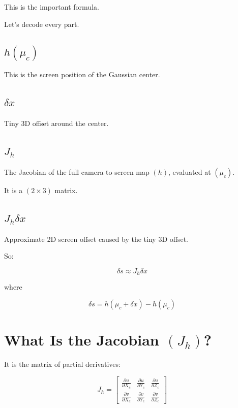 \documentclass[11pt,letterpaper]{article}
\begin{document}
This is the important formula.

Let's decode every part.

\subsection{\texorpdfstring{$h(\mu_c)$}{h(mu\_c)}}

This is the screen position of the Gaussian center.

\subsection{\texorpdfstring{$\delta x$}{delta x}}

Tiny 3D offset around the center.

\subsection{\texorpdfstring{$J_h$}{J\_h}}

The Jacobian of the full camera-to-screen map $(h)$, evaluated at $(\mu_c)$.

It is a $(2 \times 3)$ matrix.

\subsection{\texorpdfstring{$J_h \delta x$}{J\_h delta x}}

Approximate 2D screen offset caused by the tiny 3D offset.

So:

\[
\delta s \approx J_h \delta x
\]

where

\[
\delta s = h(\mu_c + \delta x) - h(\mu_c)
\]

\section{What Is the Jacobian \texorpdfstring{$(J_h)$}{(J\_h)}?}

It is the matrix of partial derivatives:

\[
J_h =
\begin{bmatrix}
\frac{\partial u}{\partial X_c} & \frac{\partial u}{\partial Y_c} & \frac{\partial u}{\partial Z_c}\\
\frac{\partial v}{\partial X_c} & \frac{\partial v}{\partial Y_c} & \frac{\partial v}{\partial Z_c}
\end{bmatrix}
\]
\end{document}

